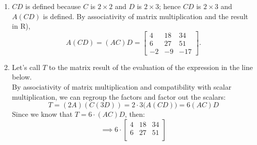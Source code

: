 \begin{enumerate}[label=\Alph*)]
\begin{answer}
                $$(AC)D = \begin{bmatrix}
                        10 & -2 \\
                        15 & -3 \\
                        -5 & 1
                    \end{bmatrix} \cdot
                    \begin{bmatrix}
                        1 & 2 & 3 \\
                        3 & 1 & -2
                    \end{bmatrix} =
                    \begin{bmatrix}
                        4 & 18 & 34 \\
                        6 & 27 & 51 \\
                        -2 & -9 & -17
                    \end{bmatrix}
                $$
            \end{answer}
            \item \begin{answer} %
                $CD$ is defined because $C$ is $2 \times 2$ and $D$ is $2 \times 3$; hence $CD$ is $2 \times 3$ and $A(CD)$ is defined.
                By associativity of matrix multiplication and the result in R),
                $$A(CD) = (AC)D = \begin{bmatrix}
                    4 & 18 & 34 \\
                    6 & 27 & 51 \\
                    -2 & -9 & -17
                \end{bmatrix}.$$
            \end{answer}
            \item \begin{answer} %
                Let's call $T$ to the matrix result of the evaluation of the expression in the line below.\\
                By associativity of matrix multiplication and compatibility with scalar multiplication, we can regroup the factors and factor out the scalars:
                $$
                    T = (2A)(C(3D)) = 2 \cdot 3 \bigl(A(CD)\bigr) = 6(AC)D
                $$
                Since we know that $T = 6 \cdot (AC)D$, then:\\ $$\implies 6 \cdot \begin{bmatrix}
                        4 & 18 & 34 \\
                        6 & 27 & 51 \\

\end{bmatrix}$$
\end{answer}
\end{enumerate}
